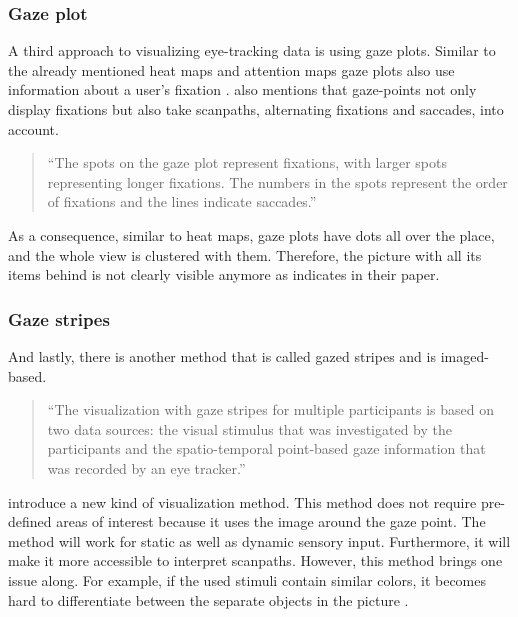 \subsubsection{Gaze plot}
A third approach to visualizing eye-tracking data is using gaze plots. Similar to the already mentioned heat maps and attention maps gaze plots also use information about a user's fixation \autocite[]{kurzhals2016gaze}. \textcite[]{kurzhals2016gaze} also mentions that gaze-points not only display fixations but also take scanpaths, alternating fixations and saccades, into account. 

\begin{quote}
``The spots on the gaze plot represent fixations, with larger spots representing longer fixations. The numbers in the spots represent the order of fixations and the lines indicate saccades.''
\autocite[]{djamasbi2014eye}
\end{quote}

As a consequence, similar to heat maps, gaze plots have dots all over the place, and the whole view is clustered with them. Therefore, the picture with all its items behind is not clearly visible anymore as \textcite[]{djamasbi2014eye} indicates in their paper.

\subsubsection{Gaze stripes}
And lastly, there is another method that is called gazed stripes and is imaged-based.

\begin{quote}
``The visualization with gaze stripes for multiple participants is based on two data sources: the visual stimulus that was investigated by the participants and the spatio-temporal point-based gaze information that was recorded by an eye tracker.''
\autocite[3]{kurzhals2016gaze}
\end{quote}

\textcite[]{kurzhals2016gaze} introduce a new kind of visualization method. This method does not require pre-defined areas of interest because it uses the image around the gaze point. The method will work for static as well as dynamic sensory input. Furthermore, it will make it more accessible to interpret scanpaths. 
However, this method brings one issue along. For example, if the used stimuli contain similar colors, it becomes hard to differentiate between the separate objects in the picture \autocite[]{kurzhals2016gaze}.


